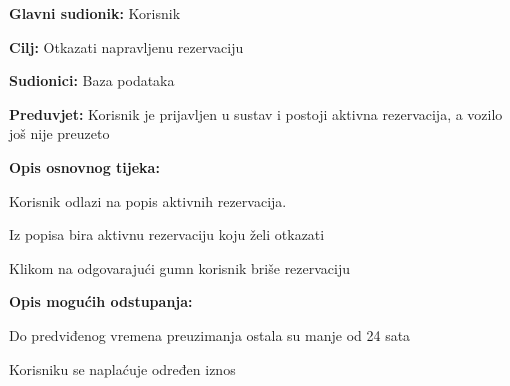 					\noindent {}
					\begin{packed_item}
	
						\item \textbf{Glavni sudionik: }Korisnik
						\item  \textbf{Cilj: }Otkazati napravljenu rezervaciju
						\item  \textbf{Sudionici: }Baza podataka
						\item  \textbf{Preduvjet: }Korisnik je prijavljen u sustav i postoji aktivna rezervacija, a vozilo još nije preuzeto
						\item  \textbf{Opis osnovnog tijeka:}
						
						\item[] \begin{packed_enum}
							\item Korisnik odlazi na popis aktivnih rezervacija.
							\item Iz popisa bira aktivnu rezervaciju koju želi otkazati
							\item Klikom na odgovarajući gumn korisnik briše rezervaciju
						\end{packed_enum}
						
						\item  \textbf{Opis mogućih odstupanja: }
						
						\item[] \begin{packed_item}
	
							\item[3.a] Do predviđenog vremena preuzimanja ostala su manje od 24 sata 
							\item[] \begin{packed_enum}
								\item Korisniku se naplaćuje određen iznos
							\end{packed_enum}
						\end{packed_item}
					\end{packed_item}
					
